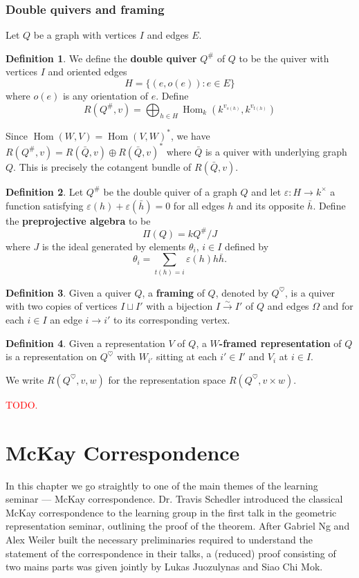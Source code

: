\documentclass[12pt]{report}
\theoremstyle{remark}
\theoremstyle{definition}
\newtheorem{definition}{Definition}[section]
\newcommand{\ve}[0]{\varepsilon}
\newcommand{\Hom}[0]{\operatorname{Hom}}
\begin{document}
    \subsection{Double quivers and framing}
    Let $Q$ be a graph with vertices $I$ and edges $E$.
    \begin{definition}
        We define the \textbf{double quiver} $Q^\#$ of $Q$ to be the quiver with vertices $I$ and oriented edges
        \[H=\{(e, o(e)): e\in E\}\]
        where $o(e)$ is any orientation of $e$. Define
        \[R(Q^\#, v)=\bigoplus_{h\in H}\Hom_k(k^{v_{s(h)}}, k^{v_{t(h)}})\]
    \end{definition}
    Since $\Hom(W, V)=\Hom(V, W)^*$, we have $R(Q^\#,v)=R(\bar{Q}, v)\oplus R(\bar{Q}, v)^*$ where $\bar Q$ is a quiver with underlying graph $Q$. This is precisely the cotangent bundle of $R(\bar{Q}, v)$.
    \begin{definition}
        Let $Q^\#$ be the double quiver of a graph $Q$ and let $\ve:H\to k^\times$ a function satisfying $\ve(h)+\ve(\bar h)=0$ for all edges $h$ and its opposite $\bar h$. Define the \textbf{preprojective algebra} to be
        \[\Pi(Q)=kQ^\#/J\]
        where $J$ is the ideal generated by elements $\theta_i$, $i\in I$ defined by 
        \[\theta_i=\sum_{t(h)=i}\ve(h)h\bar h.\]
    \end{definition}
    \begin{definition}
        Given a quiver $Q$, a \textbf{framing} of $Q$, denoted by $Q^\heartsuit$, is a quiver with two copies of vertices $I\sqcup I'$ with a bijection $I\xrightarrow{\sim} I'$ of $Q$ and edges $\Omega$ and for each $i\in I$ an edge $i\to i'$ to its corresponding vertex.
    \end{definition}
    \begin{definition}
        Given a representation $V$ of $Q$, a \textbf{$W$-framed representation} of $Q$ is a representation on $Q^\heartsuit$ with $W_{i'}$ sitting at each $i'\in I'$ and $V_i$ at $i\in I$.
    \end{definition}
    We write $R(Q^\heartsuit, v, w)$ for the representation space $R(Q^\heartsuit, v\times w)$.

    \textcolor{red}{TODO.}

    

    \chapter{McKay Correspondence}
    In this chapter we go straightly to one of the main themes of the learning seminar --- McKay correspondence. Dr. Travis Schedler introduced the classical McKay correspondence to the learning group in the first talk in the geometric representation seminar, outlining the proof of the theorem. After Gabriel Ng and Alex Weiler built the necessary preliminaries required to understand the statement of the correspondence in their talks, a (reduced) proof consisting of two mains parts was given jointly by Lukas Juozulynas and Siao Chi Mok.
    
\end{document}
